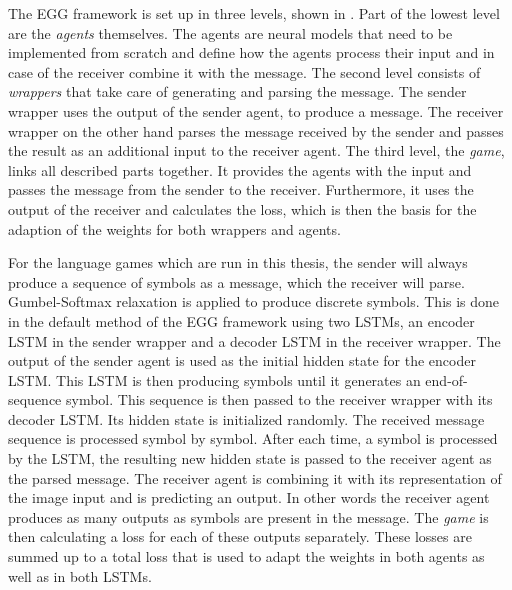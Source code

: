 The EGG framework is set up in three levels, shown in .
Part of the lowest level are the \emph{agents} themselves.
The agents are neural models that need to be implemented from scratch and define how the agents process their input and in case of the receiver combine it with the message.
The second level consists of \emph{wrappers} that take care of generating and parsing the message.
The sender wrapper uses the output of the sender agent, to produce a message.
The receiver wrapper on the other hand parses the message received by the sender and passes the result as an additional input to the receiver agent.
The third level, the \emph{game}, links all described parts together.
It provides the agents with the input and passes the message from the sender to the receiver.
Furthermore, it uses the output of the receiver and calculates the loss, which is then the basis for the adaption of the weights for both wrappers and agents.

For the language games which are run in this thesis, the sender will always produce a sequence of symbols as a message, which the receiver will parse.
Gumbel-Softmax relaxation is applied to produce discrete symbols.
This is done in the default method of the EGG framework using two LSTMs, an encoder LSTM in the sender wrapper and a decoder LSTM in the receiver wrapper.
The output of the sender agent is used as the initial hidden state for the encoder LSTM.
This LSTM is then producing symbols until it generates an end-of-sequence symbol.
This sequence is then passed to the receiver wrapper with its decoder LSTM.
Its hidden state is initialized randomly.
The received message sequence is processed symbol by symbol.
After each time, a symbol is processed by the LSTM, the resulting new hidden state is passed to the receiver agent as the parsed message.
The receiver agent is combining it with its representation of the image input and is predicting an output.
In other words the receiver agent produces as many outputs as symbols are present in the message.
The \emph{game} is then calculating a loss for each of these outputs separately.
These losses are summed up to a total loss that is used to adapt the weights in both agents as well as in both LSTMs.

